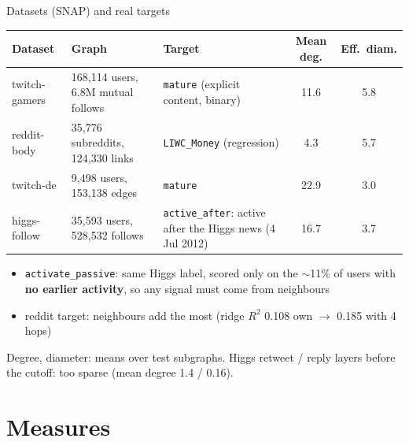 \documentclass[aspectratio=169,10pt]{beamer}
\newcommand{\snote}[1]{{\scriptsize\textcolor{ink!70}{#1}}}
\begin{document}
\begin{frame}{Datasets (SNAP) and real targets}
  \centering
  \footnotesize\renewcommand{\arraystretch}{1.25}
  \begin{tabular}{@{}L{0.14\textwidth}L{0.26\textwidth}L{0.29\textwidth}cc@{}}
    \toprule
    Dataset & Graph & Target & Mean deg. & Eff.\ diam. \\
    \midrule
    twitch-gamers & 168,114 users, 6.8M mutual follows & \texttt{mature} (explicit content, binary) & 11.6 & 5.8 \\
    reddit-body & 35,776 subreddits, 124,330 links & \texttt{LIWC\_Money} (regression) & 4.3 & 5.7 \\
    twitch-de & 9,498 users, 153,138 edges & \texttt{mature} & 22.9 & 3.0 \\
    higgs-follow & 35,593 users, 528,532 follows & \texttt{active\_after}: active after the Higgs news (4 Jul 2012) & 16.7 & 3.7 \\
    \bottomrule
  \end{tabular}
  \vspace{0.6em}

  \raggedright
  \begin{itemize}\small
    \item \texttt{activate\_passive}: same Higgs label, scored only on the $\sim$11\% of users with \textbf{no earlier activity}, so any signal must come from neighbours
    \item reddit target: neighbours add the most (ridge $R^2$ 0.108 own $\to$ 0.185 with 4 hops)
  \end{itemize}
  \snote{Degree, diameter: means over test subgraphs. Higgs retweet / reply layers before the cutoff: too sparse (mean degree 1.4 / 0.16).}
\end{frame}

\section{Measures}
\end{document}
